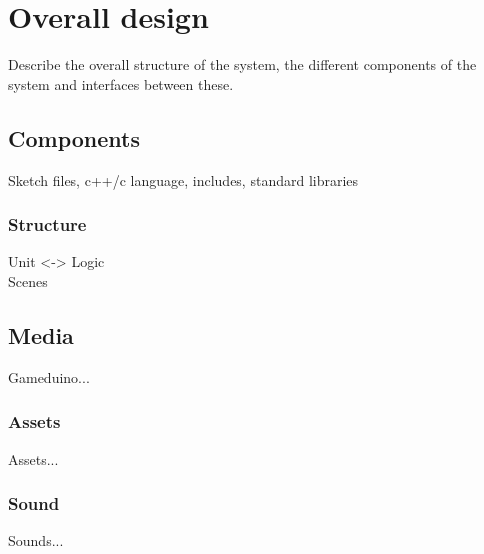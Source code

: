 \chapter{Overall design}

Describe the overall structure of the system, the different components of the system and interfaces between these.

\section{Components}
Sketch files, c++/c language, includes, standard libraries

\subsection{Structure}
Unit <-> Logic\\
Scenes

\section{Media}
Gameduino...

\subsection{Assets}
Assets...

\subsection{Sound}
Sounds...